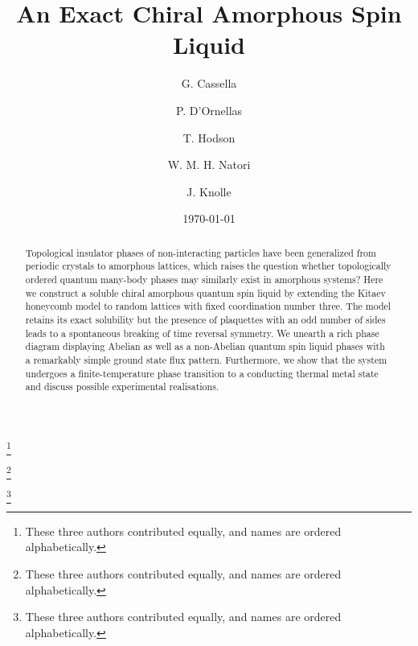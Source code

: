 \documentclass[%
 reprint,
superscriptaddress,
 amsmath,amssymb,
aps,
]{revtex4-2}
\begin{document}

\title{An Exact Chiral Amorphous Spin Liquid}


\author{G. Cassella }
\thanks{These three authors contributed equally, and names are ordered alphabetically.}


\author{P. D'Ornellas }
\thanks{These three authors contributed equally, and names are ordered alphabetically.}


\author{T. Hodson }
\thanks{These three authors contributed equally, and names are ordered alphabetically.}

\author{W. M. H. Natori }

\author{J. Knolle }



\date{\today}

\begin{abstract}
Topological insulator phases of non-interacting particles have been generalized from periodic crystals to amorphous lattices, which raises the question whether topologically ordered quantum many-body phases may similarly exist in amorphous systems? Here we construct a soluble chiral amorphous quantum spin liquid by extending the Kitaev honeycomb model to random lattices with fixed coordination number three. The model retains its exact solubility but the presence of plaquettes with an odd number of sides leads to a spontaneous breaking of time reversal symmetry. We unearth a rich phase diagram displaying Abelian as well as a non-Abelian quantum spin liquid phases with a remarkably simple ground state flux pattern. Furthermore, we show that the system undergoes a finite-temperature phase transition to a conducting thermal metal state and discuss possible experimental realisations. 
\end{abstract}
\end{document}
